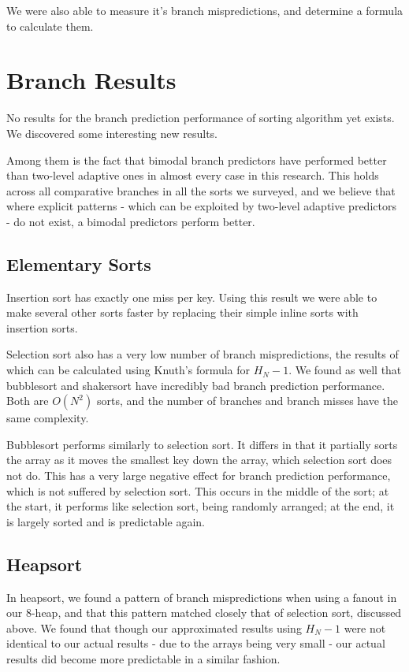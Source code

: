 We were also able to measure it's branch mispredictions, and determine a formula
to calculate them.




\section{Branch Results}


No results for the branch prediction performance of sorting algorithm yet
exists. We discovered some interesting new results. 

Among them is the fact that bimodal branch predictors have performed better than
two-level adaptive ones in almost every case in this research. This holds across
all comparative branches in all the sorts we surveyed, and we believe that where
explicit patterns - which can be exploited by two-level adaptive predictors - do
not exist, a bimodal predictors perform better.


\subsection{Elementary Sorts}

Insertion sort has exactly one miss per key. Using this result we were able to
make several other sorts faster by replacing their simple inline sorts with
insertion sorts.

Selection sort also has a very low number of branch mispredictions, the results
of which can be calculated using Knuth's formula for $H_N-1$. We found as well
that bubblesort and shakersort have incredibly bad branch prediction
performance. Both are $O(N^2)$ sorts, and the number of branches and branch
misses have the same complexity.

Bubblesort performs similarly to selection sort. It differs in that it partially
sorts the array as it moves the smallest key down the array, which selection sort
does not do. This has a very large negative effect for branch prediction
performance, which is not suffered by selection sort. This occurs in the middle
of the sort; at the start, it performs like selection sort, being randomly
arranged; at the end, it is largely sorted and is predictable again.

\subsection{Heapsort}

In heapsort, we found a pattern of branch mispredictions when using a fanout in
our 8-heap, and that this pattern matched closely that of selection sort,
discussed above. We found that though our approximated results using $H_N-1$
were not identical to our actual results - due to the arrays being very small -
our actual results did become more predictable in a similar fashion.

